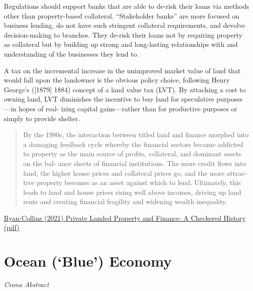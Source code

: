 \documentclass[
]{book}
\begin{document}
Regulations should support banks that are able to de-risk their loans
via methods other than property-based collateral.
``Stakeholder banks'' are more focused on business lending, do
not have such stringent collateral requirements, and devolve
decision-making to branches. They de-risk their loans not
by requiring property as collateral but by building up strong and
long-­lasting relationships with and understanding of the businesses
they lend to.

A tax on the incremental increase in the unimproved market value
of land that would fall upon the landowner is the obvious policy
choice, following Henry George's ({[}1879{]} 1884) concept of a land
value tax (LVT). By attaching a cost to owning land, LVT diminishes
the incentive to buy land for speculative purposes---­in hopes of real-
izing capital gains---­rather than for productive purposes or simply to
provide shelter.

\begin{quote}
By the 1980s, the interaction
between titled land and finance morphed into a damaging feedback
cycle whereby the financial sectors became addicted to property as
the main source of profits, collateral, and dominant assets on the bal-
ance sheets of financial institutions.
The more credit flows into land,
the higher house prices and collateral prices go, and the more attrac-
tive property becomes as an asset against which to lend. Ultimately,
this leads to land and house prices rising well above incomes, driving
up land rents and creating financial fragility and widening wealth
inequality.
\end{quote}

\href{https://onlinelibrary.wiley.com/doi/10.1111/ajes.12387}{Ryan-Collins (2021) Private Landed Property and Finance: A Checkered History}
\href{pdf/Ryan-Collins_2021_Private_Landed_Property_and_Finance.pdf}{(pdf)}

\hypertarget{ocean-blue-economy}{%
\section{Ocean (`Blue') Economy}\label{ocean-blue-economy}}

\emph{Crona Abstract}
\end{document}
